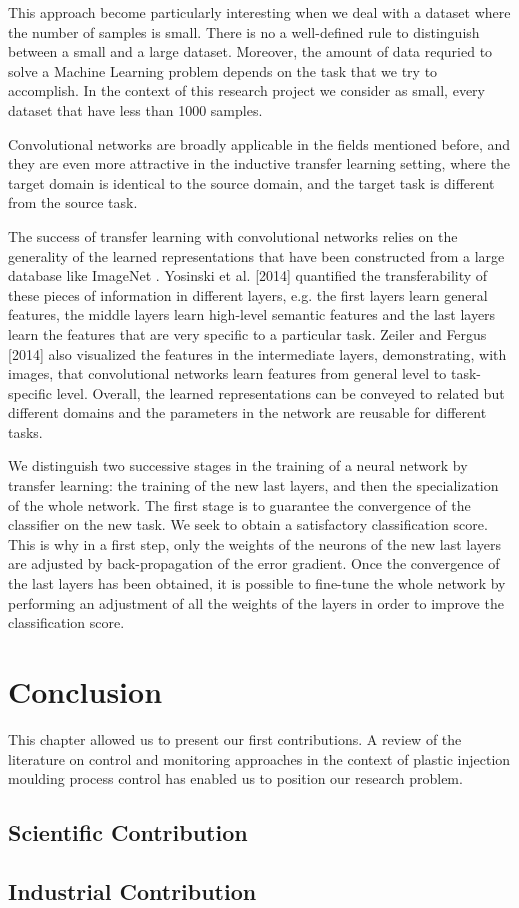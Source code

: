 This approach become particularly interesting when we deal with a dataset where the number of samples is small. There is no a well-defined rule to distinguish between a small and a large dataset. Moreover, the amount of data requried to solve a Machine Learning problem depends on the task that we try to accomplish. In the context of this research project we consider as small, every dataset that have less than 1000 samples.

Convolutional networks are broadly applicable in the fields mentioned before, and they are even more attractive in the inductive transfer learning setting, where the target domain is identical to the source domain, and the target task is different from the source task.

The success of transfer learning with convolutional networks relies on the generality of the learned representations that have been constructed from a large database like ImageNet \citep{deng2009imagenet}. Yosinski et al. [2014] quantified the transferability of these pieces of information in different layers, e.g. the first layers learn general features, the middle layers learn high-level semantic features and the last layers learn the features that are very specific to a particular task. Zeiler and Fergus [2014] also visualized the features in the intermediate layers, demonstrating, with images, that convolutional networks learn features from general level to task-specific level. Overall, the learned representations can be conveyed to related but different domains and the parameters in the
network are reusable for different tasks.

We distinguish two successive stages in the training of a neural network by transfer learning: the training of the new last layers, and then the specialization of the whole network. The first stage is to guarantee the convergence of the classifier on the new task. We seek to obtain a satisfactory classiﬁcation score. This is why in a first step, only the weights of the neurons of the new last layers are adjusted by back-propagation of the error gradient. Once the convergence of the last layers has been obtained, it is possible to fine-tune the whole network by performing an adjustment of all the weights of the layers in order to improve the classiﬁcation score.


\section{Conclusion}

This chapter allowed us to present our first contributions. A review of the literature on control and monitoring approaches in the context of plastic injection moulding process control has enabled us to position our research problem.

\subsection{Scientific Contribution}

\subsection{Industrial Contribution}


